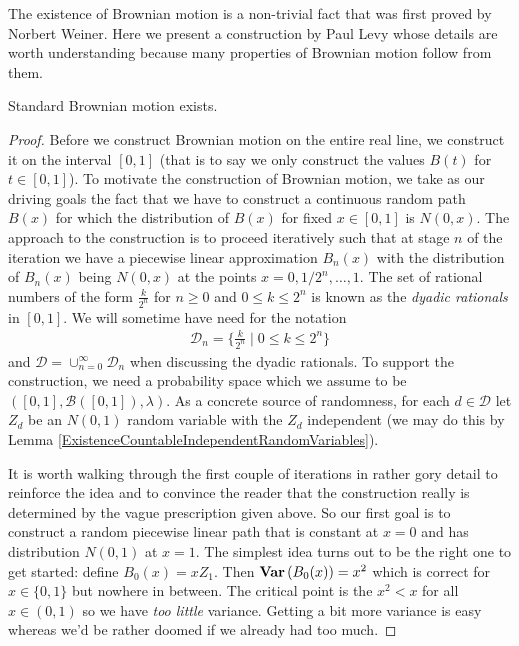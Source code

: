The existence of Brownian motion is a non-trivial fact that was first
proved by Norbert Weiner.  Here we present a construction by Paul Levy
whose details are worth understanding because many properties of
Brownian motion follow from them.
\begin{thm}Standard Brownian motion exists.
\end{thm}
\begin{proof}
Before we construct Brownian motion on the entire real line, we
construct it on the interval $[0,1]$ (that is to say we only construct
the values $B(t)$ for $t \in [0,1]$).  
To motivate the construction of Brownian motion, we take as our
driving goals the fact that we have to construct a continuous random
path $B(x)$ for which the distribution of $B(x)$ for fixed $x \in
[0,1]$ is $N(0, x)$.  The approach to the construction is to proceed
iteratively such that at stage $n$ of the iteration we have a
piecewise linear approximation $B_n(x)$ with the distribution of $B_n(x)$ being
$N(0,x)$ at the points $x = 0, 1/2^n, \dots, 1$. The set of rational
  numbers of the form $\frac{k}{2^n}$ for $n \geq 0$ and $0 \leq k
  \leq 2^n$ is known as the \emph{dyadic rationals} in $[0,1]$.  We will sometime
  have need for the notation
\begin{align*}
\mathcal{D}_n = \lbrace \frac{k}{2^n} \mid 0 \leq k \leq 2^n \rbrace
\end{align*}
and $\mathcal{D} = \cup_{n=0}^\infty \mathcal{D}_n$ when discussing
the dyadic rationals.  To support the construction, we need a
probability space which we assume to be $([0,1], \mathcal{B}([0,1]),
\lambda)$.  As a concrete source of randomness, for
each $d \in \mathcal{D}$ let $Z_d$ be an $N(0,1)$ random variable
with the $Z_d$ independent (we may do this by Lemma
\ref{ExistenceCountableIndependentRandomVariables}).

It is worth walking through the first couple of iterations in rather
gory detail to reinforce the idea and to convince the reader that the
construction really is determined by the vague prescription given
above.  So our first goal is to construct a random piecewise linear
path that is constant at $x=0$ and has distribution $N(0,1)$ at
$x=1$.  The simplest idea turns out to be the right one to get
started: define $B_0(x) = x Z_1$.  Then $\textbf{Var} \left (B_0(x) \right ) = x^2$
which is correct for $x \in \lbrace 0,1\rbrace $ but nowhere in between.  The critical
point is the $x^2 < x$ for all $x \in (0,1)$ so we have \emph{too
  little} variance.  Getting a bit more variance is easy whereas we'd
be rather doomed if we already had too much.  


\end{proof}
